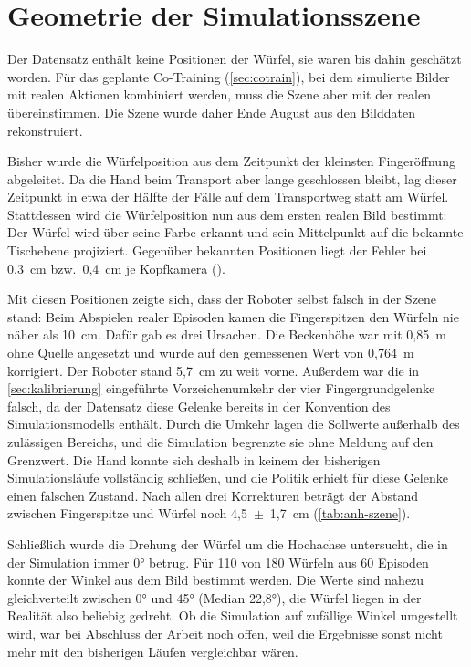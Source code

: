 \section{Geometrie der Simulationsszene}
\label{sec:geometrie}
\label{sec:wuerfellage}
\label{sec:vorzeichen-widerruf}
\label{sec:gierwinkel}

Der Datensatz enthält keine Positionen der Würfel, sie waren bis dahin
geschätzt worden. Für das geplante Co-Training (\cref{sec:cotrain}), bei dem
simulierte Bilder mit realen Aktionen kombiniert werden, muss die Szene aber
mit der realen übereinstimmen. Die Szene wurde daher Ende August aus den
Bilddaten rekonstruiert.

Bisher wurde die Würfelposition aus dem Zeitpunkt der kleinsten
Fingeröffnung abgeleitet. Da die Hand beim Transport aber lange geschlossen
bleibt, lag dieser Zeitpunkt in etwa der Hälfte der Fälle auf dem
Transportweg statt am Würfel. Stattdessen wird die Würfelposition nun aus dem
ersten realen Bild bestimmt: Der Würfel wird über seine Farbe erkannt und sein
Mittelpunkt auf die bekannte Tischebene projiziert. Gegenüber bekannten
Positionen liegt der Fehler bei 0,3~cm bzw.\ 0,4~cm je Kopfkamera
().

Mit diesen Positionen zeigte sich, dass der Roboter selbst falsch in der
Szene stand: Beim Abspielen realer Episoden kamen die Fingerspitzen den
Würfeln nie näher als 10~cm. Dafür gab es drei Ursachen. Die Beckenhöhe war
mit 0,85~m ohne Quelle angesetzt und wurde auf den gemessenen Wert von
0,764~m korrigiert. Der Roboter stand 5,7~cm zu weit vorne. Außerdem war die
in \cref{sec:kalibrierung} eingeführte Vorzeichenumkehr der vier
Fingergrundgelenke falsch, da der Datensatz diese Gelenke bereits in der
Konvention des Simulationsmodells enthält. Durch die Umkehr lagen die
Sollwerte außerhalb des zulässigen Bereichs, und die Simulation begrenzte sie
ohne Meldung auf den Grenzwert. Die Hand konnte sich deshalb in keinem der
bisherigen Simulationsläufe vollständig schließen, und die Politik erhielt
für diese Gelenke einen falschen Zustand. Nach allen drei Korrekturen beträgt
der Abstand zwischen Fingerspitze und Würfel noch 4,5~$\pm$~1,7~cm
(\cref{tab:anh-szene}).

Schließlich wurde die Drehung der Würfel um die Hochachse untersucht, die in
der Simulation immer 0° betrug. Für 110 von 180 Würfeln aus 60 Episoden
konnte der Winkel aus dem Bild bestimmt werden. Die Werte sind nahezu
gleichverteilt zwischen 0° und 45° (Median 22,8°), die Würfel liegen in der
Realität also beliebig gedreht. Ob die Simulation auf zufällige Winkel
umgestellt wird, war bei Abschluss der Arbeit noch offen, weil die Ergebnisse
sonst nicht mehr mit den bisherigen Läufen vergleichbar wären.
